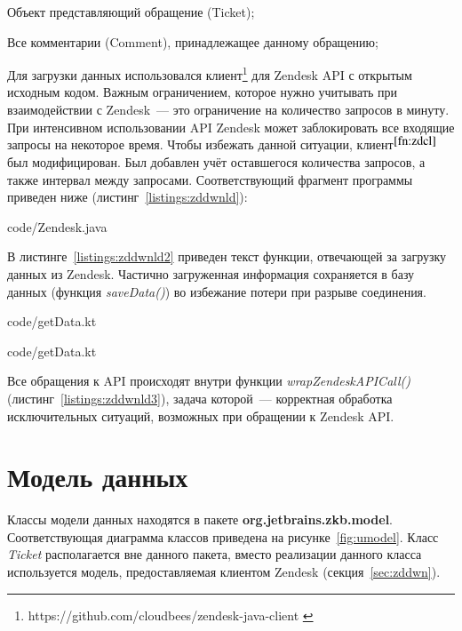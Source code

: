 \begin{enumerate*}
\item Объект представляющий обращение (Ticket);
\item Все комментарии (Comment), принадлежащее данному обращению;
\end{enumerate*}

Для загрузки данных использовался клиент\footnote{https://github.com/cloudbees/zendesk-java-client \label{fn:zdcl}} для Zendesk API с открытым исходным кодом. Важным ограничением, которое нужно учитывать при взаимодействии с Zendesk~--- это ограничение на количество запросов в минуту. При интенсивном использовании API Zendesk может заблокировать все входящие запросы на некоторое время. Чтобы избежать данной ситуации, клиент$^{\ref{fn:zdcl}}$ был модифицирован. Был добавлен учёт оставшегося количества запросов, а также интервал между запросами. Соответствующий фрагмент программы приведен ниже (листинг~\ref{listings:zddwnld}):


{code/Zendesk.java}

В листинге~\ref{listings:zddwnld2} приведен текст функции, отвечающей за загрузку данных из Zendesk. Частично загруженная информация сохраняется в базу данных (функция \textit{saveData()}) во избежание потери при разрыве соединения.


{code/getData.kt}


{code/getData.kt}

Все обращения к API происходят внутри функции \textit{wrapZendeskAPICall()} (листинг~\ref{listings:zddwnld3}), задача которой~--- корректная обработка исключительных ситуаций, возможных при обращении к Zendesk API.

\section{Модель данных}

Классы модели данных находятся в пакете \textbf{org.jetbrains.zkb.model}. Соответствующая диаграмма классов приведена на рисунке~\ref{fig:umodel}. Класс \textit{Ticket} располагается вне данного пакета, вместо реализации данного класса используется модель, предоставляемая клиентом Zendesk (секция~\ref{sec:zddwn}).

